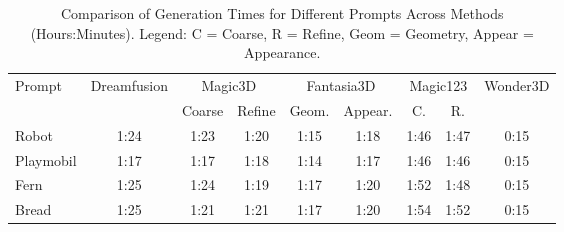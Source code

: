 \begin{table}[h]
    \centering
    \small 
    \begin{tabular}{lcccccccc}
    \toprule
    Prompt & Dreamfusion & \multicolumn{2}{c}{Magic3D} & \multicolumn{2}{c}{Fantasia3D} & \multicolumn{2}{c}{Magic123} & Wonder3D \\
    \cmidrule(r){3-4} \cmidrule(lr){5-6} \cmidrule(l){7-8}
    & & \multicolumn{1}{c}{Coarse} & \multicolumn{1}{c}{Refine} & \multicolumn{1}{c}{Geom.} & \multicolumn{1}{c}{Appear.} & \multicolumn{1}{c}{C.} & \multicolumn{1}{c}{R.} &  \\
    \midrule
    Robot & 1:24 & 1:23 & 1:20 & 1:15 & 1:18 & 1:46 & 1:47 & 0:15 \\
    Playmobil & 1:17 & 1:17 & 1:18 & 1:14 & 1:17 & 1:46 & 1:46 & 0:15 \\
    Fern & 1:25 & 1:24 & 1:19 & 1:17 & 1:20 & 1:52 & 1:48 & 0:15 \\
    Bread & 1:25 & 1:21 & 1:21 & 1:17 & 1:20 & 1:54 & 1:52 & 0:15 \\
    \bottomrule
    \end{tabular}
    \caption{Comparison of Generation Times for Different Prompts Across Methods (Hours:Minutes). Legend: C = Coarse, R = Refine, Geom = Geometry, Appear = Appearance.}~\label{table:generation_times_complex}
\end{table}

    
    
    
    
    
    
    
    
    